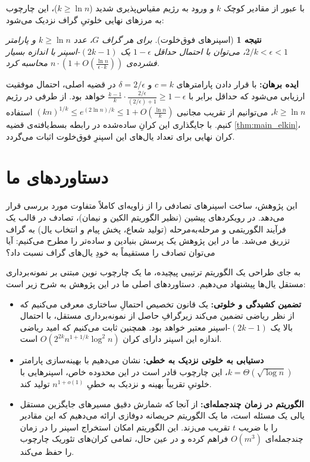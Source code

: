 \documentclass[11pt,a4paper]{report}
\theoremstyle{plain}
\newtheorem{cor}[thm]{\normalsize نتیجه}
\theoremstyle{definition}
\theoremstyle{remark}
\begin{document}
با عبور از مقادیر کوچک $k$ و ورود به رژیم مقیاس‌پذیری شدید ($k \ge \ln n$)، این چارچوب به مرزهای نهایی خلوتیِ گراف نزدیک می‌شود:

\begin{cor}[اسپنرهای فوق‌خلوت]
برای هر گراف $G$، عدد $k \ge \ln n$ و پارامتر $2/k < \epsilon < 1$، می‌توان با احتمال حداقل $1-\epsilon$ یک $(2k-1)$-اسپنر با اندازه بسیار فشرده‌ی $n \cdot \left(1 + O(\frac{\ln n}{\epsilon \cdot k})\right)$ محاسبه کرد.
\end{cor}
\textbf{ایده برهان:} با قرار دادن پارامترهای $c = k$ و $\delta = 2/\epsilon$ در قضیه اصلی، احتمال موفقیت ارزیابی می‌شود که حداقل برابر با $\frac{k-1}{k} \cdot \frac{2/\epsilon}{(2/\epsilon) + 1} \ge 1 - \epsilon$ خواهد بود. از طرفی در رژیم $k \ge \ln n$، می‌توانیم از تقریب مجانبی $(kn)^{1/k} \le e^{(2\ln n)/k} \le 1 + O(\frac{\ln n}{k})$ استفاده کنیم. با جایگذاری این کرانِ ساده‌شده در رابطه بسط‌یافته‌ی قضیه \ref{thm:main_elkin}، کران نهایی برای تعداد یال‌های این اسپنرِ فوق‌خلوت اثبات می‌گردد.

\section{دستاوردهای ما}
این پژوهش، ساخت اسپنرهای تصادفی را از زاویه‌ای کاملاً متفاوت مورد بررسی قرار می‌دهد. در رویکردهای پیشین (نظیر الگوریتم الکین و نیمان)، تصادف در قالب یک فرآیند الگوریتمی و مرحله‌به‌مرحله (تولید شعاع، پخش پیام و انتخاب یال) به گراف تزریق می‌شد. ما در این پژوهش یک پرسش بنیادین و ساده‌تر را مطرح می‌کنیم: آیا می‌توان تصادف را مستقیماً به خودِ یال‌های گراف نسبت داد؟

به جای طراحی یک الگوریتم ترتیبی پیچیده، ما یک چارچوب نوین مبتنی بر نمونه‌برداری مستقل یال‌ها پیشنهاد می‌دهیم. دستاوردهای اصلی ما در این پژوهش به شرح زیر است:
\begin{itemize}
    \item \textbf{تضمین کشیدگی و خلوتی:} یک قانون تخصیص احتمالِ ساختاری معرفی می‌کنیم که از نظر ریاضی تضمین می‌کند زیرگرافِ حاصل از نمونه‌برداری مستقل، با احتمال بالا یک $(2k-1)$-اسپنر معتبر خواهد بود. همچنین ثابت می‌کنیم که امید ریاضی اندازه این اسپنر دارای کران $O(2^{2k} n^{1+1/k} \log^2 n)$ است.
    
    \item \textbf{دستیابی به خلوتی نزدیک به خطی:} نشان می‌دهیم با بهینه‌سازی پارامتر $k = \Theta(\sqrt{\log n})$، این چارچوب قادر است در این محدوده خاص، اسپنرهایی با خلوتیِ تقریباً بهینه و نزدیک به خطیِ $n^{1+o(1)}$ تولید کند.
    
    \item \textbf{الگوریتم در زمان چندجمله‌ای:} از آنجا که شمارش دقیق مسیرهای جایگزین مستقل یالی یک مسئله  است، ما یک الگوریتم حریصانه دوفازی ارائه می‌دهیم که این مقادیر را با ضریب $t$ تقریب می‌زند. این الگوریتم امکان استخراج اسپنر را در زمان چندجمله‌ای $O(m^3)$ فراهم کرده و در عین حال، تمامی کران‌های تئوریک چارچوب را حفظ می‌کند.
\end{itemize}
\end{document}
